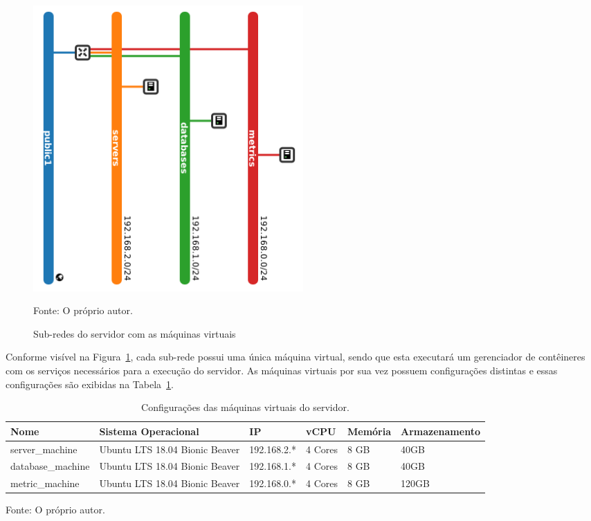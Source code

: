 \begin{figure}[htb!]
  \caption{Sub-redes do servidor com as máquinas virtuais}
  \label{fig:virtual_machines}
  \includegraphics[width=0.5\textwidth]{figuras/network/bars.png}
  \centering

  Fonte: O próprio autor.
\end{figure}



Conforme visível na Figura~\ref{fig:virtual_machines}, cada sub-rede possui uma única máquina virtual, sendo que esta executará um gerenciador de contêineres com os serviços necessários para a execução do servidor.
%
As máquinas virtuais por sua vez possuem configurações distintas e essas configurações são exibidas na Tabela~\ref{tab:configuracao_das_maquinas}.
\pagebreak


\begin{table}[htb!]
\centering
\begin{adjustbox}{max width=\textwidth}
\caption{Configurações das máquinas virtuais do servidor.}
\label{tab:configuracao_das_maquinas}
\begin{tabular}{l|l|l|l|l|l}
\hline \hline
Nome              & Sistema Operacional            & IP          & vCPU    & Memória & Armazenamento \\ \hline \hline
server\_machine   & Ubuntu LTS 18.04 Bionic Beaver & 192.168.2.* & 4 Cores & 8 GB    & 40GB          \\ \hline
database\_machine & Ubuntu LTS 18.04 Bionic Beaver & 192.168.1.* & 4 Cores & 8 GB    & 40GB          \\ \hline
metric\_machine   & Ubuntu LTS 18.04 Bionic Beaver & 192.168.0.* & 4 Cores & 8 GB    & 120GB         \\ \hline \hline
\end{tabular}
\end{adjustbox}

Fonte: O próprio autor.
\end{table}



